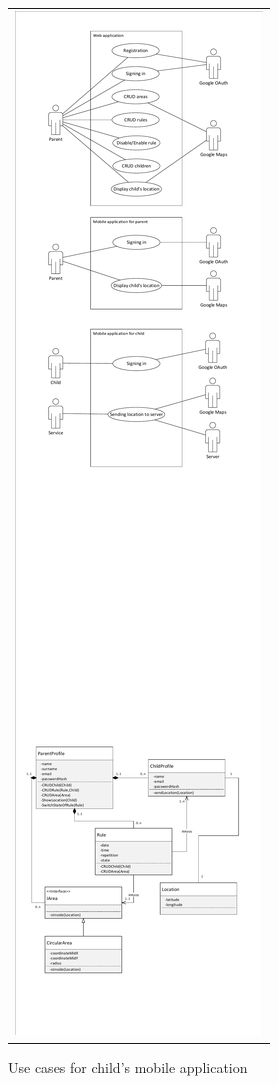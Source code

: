 \documentclass{sprawozdanie-agh}
\begin{document}
    	\begin{figure}[H]
    		\centering
    		\begin{tabular}{c}
    			\includegraphics[width=.80\textwidth]{childUseCase}
    		\end{tabular}
    		\caption{Use cases for child's mobile application}
    	\end{figure}
\end{document}
